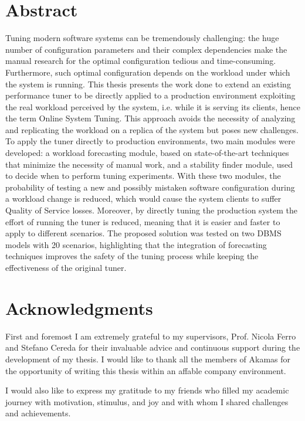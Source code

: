 \documentclass[a4paper, 12pt]{article} %
\begin{document}
	\section*{Abstract}
	\thispagestyle{plain}
	Tuning modern software systems can be tremendously challenging: the huge number of configuration parameters and their complex dependencies make the manual research for the optimal configuration tedious and time-consuming. Furthermore, such optimal configuration depends on the workload under which the system is running. 
	This thesis presents the work done to extend an existing performance tuner to be directly applied to a production environment exploiting the real workload perceived by the system, i.e. while it is serving its clients, hence the term Online System Tuning. This approach avoids the necessity of analyzing and replicating the workload on a replica of the system but poses new challenges.
	To apply the tuner directly to production environments, two main modules were developed: a workload forecasting module, based on state-of-the-art techniques that minimize the necessity of manual work, and a stability finder module, used to decide when to perform tuning experiments. With these two modules, the probability of testing a new and possibly mistaken software configuration during a workload change is reduced, which would cause the system clients to suffer Quality of Service losses.
	Moreover, by directly tuning the production system the effort of running the tuner is reduced, meaning that it is easier and faster to apply to different scenarios.
	The proposed solution was tested on two DBMS models with 20 scenarios, highlighting that the integration of forecasting techniques improves the safety of the tuning process while keeping the effectiveness of the original tuner.
	
	
	\section*{Acknowledgments}
	\thispagestyle{plain}
	First and foremost I am extremely grateful to my supervisors, Prof.  Nicola Ferro and Stefano Cereda for their invaluable advice and continuous support during the development of my thesis.  I would like to thank all the members of Akamas for the opportunity of writing this thesis within an affable company environment. 
	
	I would also like to express my gratitude to my friends who filled my academic journey with motivation, stimulus, and joy and with whom I shared challenges and achievements.
	
\end{document}
